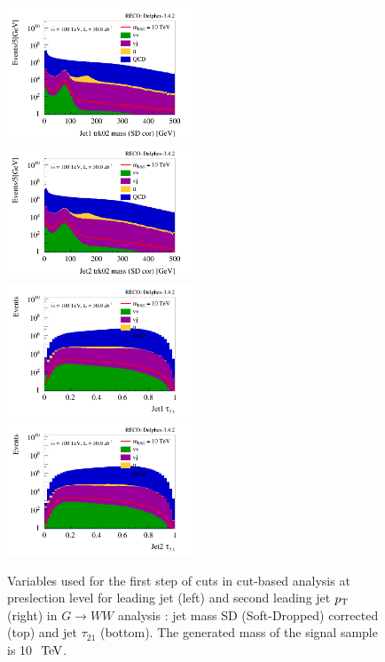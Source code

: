 \documentclass{cernrep}
\begin{document}
\begin{figure}[!htb]\centering
\includegraphics[width=0.495\textwidth]{Fig/RSGww/cut/Jet1_trk02_SD_Cor_m_sel0_nostack_log.png}
\includegraphics[width=0.495\textwidth]{Fig/RSGww/cut/Jet2_trk02_SD_Cor_m_sel0_nostack_log.png}
\includegraphics[width=0.495\textwidth]{Fig/RSGww/cut/Jet1_tau21_sel0_nostack_log.png}
\includegraphics[width=0.495\textwidth]{Fig/RSGww/cut/Jet2_tau21_sel0_nostack_log.png}
\caption{Variables used for the first step of cuts in cut-based analysis at preslection level for leading jet (left) and second leading jet $p\sb{\scriptstyle\mathrm{T}}$ (right) in $G \rightarrow WW$ analysis : jet mass SD (Soft-Dropped) corrected (top) and jet $\tau_{21}$ (bottom). The generated mass of the signal sample is 10 $\TeV$.}
\label{fig:RSGww_sel0_cut}
\end{figure}
\end{document}
